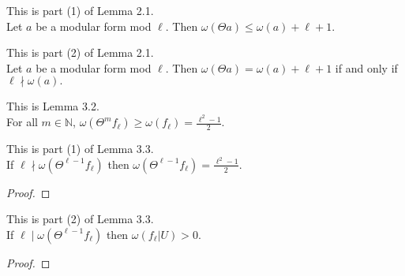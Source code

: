 \begin{theorem}
  \label{thm:Filt_Theta_bound}
  \leanok
  This is part (1) of Lemma 2.1. \\
  Let $a$ be a modular form mod $\ell$. Then $\omega (\Theta a) \le \omega (a) + \ell + 1$.
\end{theorem}

\begin{theorem}
  \label{thm:Filt_Theta_iff}
  \leanok
  This is part (2) of Lemma 2.1. \\
  Let $a$ be a modular form mod $\ell$. Then $\omega (\Theta a) = \omega (a) + \ell + 1$ 
  if and only if $\ell \nmid \omega (a).$
\end{theorem}

\begin{theorem}
  \label{thm:le_Filt_Theta_fl}
  \leanok
  This is Lemma 3.2. \\
  For all $m \in \mathbb{N}$, $\omega (\Theta^m f_\ell) \ge \omega (f_\ell) = \frac{\ell^2 - 1}{2}.$
\end{theorem} 


\begin{theorem}
  \label{thm:Filt_Theta_pow_l_sub_one} 
  \leanok
  This is part (1) of Lemma 3.3. \\
  If $\ell \nmid \omega (\Theta^{\ell - 1} f_\ell)$ then 
  $\omega (\Theta^{\ell - 1} f_\ell) = \frac{\ell^2 - 1}{2}.$
\end{theorem}
\begin{proof}
  \leanok
\end{proof}

\begin{theorem}
  \label{thm:Filt_U_pos}
  \leanok
  This is part (2) of Lemma 3.3. \\
  If $\ell \mid \omega (\Theta^{\ell - 1} f_\ell)$ then 
  $\omega (f_\ell | U) > 0$.
\end{theorem}
\begin{proof}
  \leanok
\end{proof}
